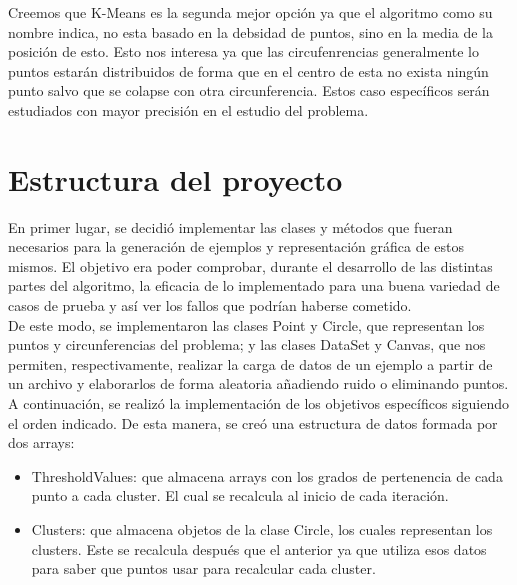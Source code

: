 \documentclass[conference,a4paper]{IEEEtran}
\begin{document}
Creemos que K-Means es la segunda mejor opción ya que el algoritmo como su nombre indica, no esta basado en la debsidad de puntos, sino en la media de la posición de esto. Esto nos interesa ya que las circufenrencias generalmente lo puntos estarán distribuidos de forma que en el centro de esta no exista ningún punto salvo que se colapse con otra circunferencia. Estos caso específicos serán estudiados con mayor precisión en el estudio del problema.\\


\section{Estructura del proyecto}

En primer lugar, se decidió implementar las clases y métodos que fueran necesarios para la generación de ejemplos y representación gráfica de estos mismos. El objetivo era poder comprobar, durante el desarrollo de las distintas partes del algoritmo, la eficacia de lo implementado para una buena variedad de casos de prueba y así ver los fallos que podrían haberse cometido. \\
De este modo, se implementaron las clases Point y Circle, que representan los puntos y circunferencias del problema; y las clases DataSet y Canvas, que nos permiten, respectivamente, realizar la carga de datos de un ejemplo a partir de un archivo y elaborarlos de forma aleatoria  añadiendo ruido o eliminando puntos.\\

A continuación, se realizó la implementación de los objetivos específicos siguiendo el orden indicado. De esta manera, se creó una estructura de datos formada por dos arrays: 
\begin{itemize}
	\item ThresholdValues: que almacena arrays con los grados de pertenencia de cada punto a cada cluster. El cual se recalcula al inicio de cada iteración.
	\item Clusters: que almacena objetos de la clase Circle, los cuales representan los clusters. Este se recalcula después que el anterior ya que utiliza esos datos para saber que puntos usar para recalcular cada cluster.\\
\end{itemize}
\end{document}
